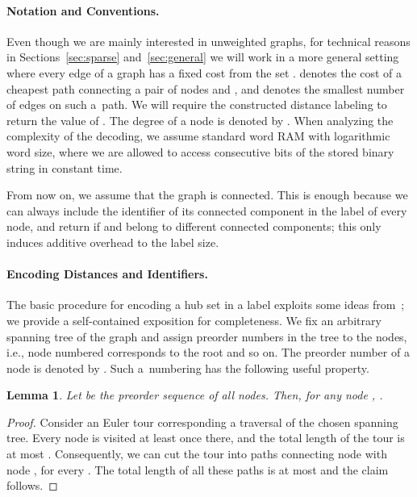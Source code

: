 \documentclass{article}[11pt,letter]
\newtheorem{lemma}[definition]{Lemma}
\begin{document}
\paragraph{Notation and Conventions.}
Even though we are mainly interested in unweighted graphs, for technical reasons in Sections~\ref{sec:sparse} and~\ref{sec:general} we will work in a more general setting where every edge of a graph has a fixed cost from the set .  denotes the cost of a cheapest path
connecting a pair of nodes  and , and  denotes the smallest number of edges on such a~path. We will require the constructed distance labeling to return the value of . The degree of a node  is denoted by . When analyzing the complexity of the decoding, we assume standard word RAM with logarithmic word size, where we are allowed to access  consecutive bits of the stored binary string in constant time.

From now on, we assume that the graph is connected. This is enough because we can always include the identifier of its connected component in the label of every node, and return  if  and  belong to different connected components; this only induces additive  overhead to the label size.

\paragraph{Encoding Distances and Identifiers.}

The basic procedure for encoding a hub set in a label exploits some ideas from~\cite{DBLP:conf/soda/AlstrupGHP16}; we provide a self-contained exposition for completeness. We fix an arbitrary spanning tree of the graph and assign preorder numbers in the tree to the nodes, i.e., node numbered  corresponds to the root and so on. The preorder number of a node  is denoted by . Such a~numbering has the following useful property.

\begin{lemma}
\label{lem:sum}
Let  be the preorder sequence of all nodes.
Then, for any node , .
\end{lemma}

\begin{proof}
Consider an Euler tour corresponding a traversal of the chosen spanning tree. Every node is visited at least
once there, and the total length of the tour is at most . Consequently, we can cut the tour
into paths connecting node  with node , for every . The total length
of all these paths is at most  and the claim follows.
\end{proof}
\end{document}
